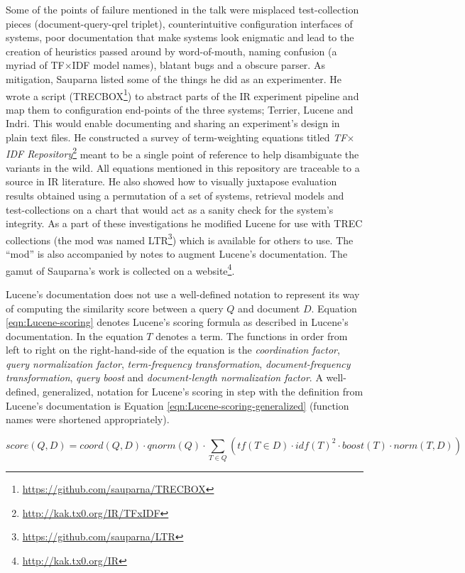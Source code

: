 Some of the points of failure mentioned in the talk were misplaced
test-collection pieces (document-query-qrel triplet), counterintuitive
configuration interfaces of systems, poor documentation that make
systems look enigmatic and lead to the creation of heuristics passed
around by word-of-mouth, naming confusion (a myriad of TF$\times$IDF
model names), blatant bugs and a obscure parser. As mitigation,
Sauparna listed some of the things he did as an experimenter. He wrote
a script (TRECBOX\footnote{\url{https://github.com/sauparna/TRECBOX}})
to abstract parts of the IR experiment pipeline and map them to
configuration end-points of the three systems; Terrier, Lucene and
Indri. This would enable documenting and sharing an experiment's
design in plain text files. He constructed a survey of term-weighting
equations titled \emph{TF$\times$IDF
  Repository}\footnote{\url{http://kak.tx0.org/IR/TFxIDF}} meant to be
a single point of reference to help disambiguate the variants in the
wild. All equations mentioned in this repository are traceable to a
source in IR literature. He also showed how to visually juxtapose
evaluation results obtained using a permutation of a set of systems,
retrieval models and test-collections on a chart that would act as a
sanity check for the system's integrity. As a part of these
investigations he modified Lucene for use with TREC collections (the
mod was named LTR\footnote{\url{https://github.com/sauparna/LTR}})
which is available for others to use. The ``mod'' is also accompanied
by notes to augment Lucene's documentation. The gamut of Sauparna's
work is collected on a website\footnote{\url{http://kak.tx0.org/IR}}.

Lucene's documentation does not use a well-defined notation to
represent its way of computing the similarity score between a query
$Q$ and document $D$. Equation \eqref{eqn:Lucene-scoring} denotes
Lucene's scoring formula as described in Lucene's documentation. In
the equation $T$ denotes a term. The functions in order from left to
right on the right-hand-side of the equation is the \emph{coordination
  factor}, \emph{query normalization factor}, \emph{term-frequency
  transformation}, \emph{document-frequency transformation},
\emph{query boost} and \emph{document-length normalization factor}. A
well-defined, generalized, notation for Lucene's scoring in step with
the definition from Lucene's documentation is Equation
\eqref{eqn:Lucene-scoring-generalized} (function names were shortened
appropriately).

\begin{equation}
  score(Q,D) = coord(Q,D) \cdot qnorm(Q) \cdot \displaystyle\sum_{T \in Q} (tf(T \in D) \cdot idf(T)^2 \cdot boost(T) \cdot norm(T,D))
  \label{eqn:Lucene-scoring}
\end{equation}

